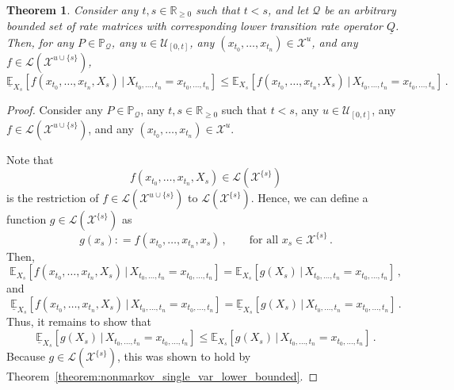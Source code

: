 \documentclass[10pt]{paper}
\newtheorem{theorem}{Theorem}
\newcommand{\reals}{\mathbb{R}}
\newcommand{\realsnonneg}{\reals_{\geq 0}}
\newcommand{\states}{\mathcal{X}}
\newcommand{\processes}{\mathbb{P}}
\newcommand{\gambles}{\mathcal{L}}
\newcommand{\rateset}{\mathcal{Q}}
\newcommand{\lrate}{\underline{Q}}
\newcommand{\coloneqq}{:\!=}
\begin{document}
\begin{theorem}
Consider any $t,s\in\realsnonneg$ such that $t<s$, and let $\rateset$ be an arbitrary bounded set of rate matrices with corresponding lower transition rate operator $\lrate$. Then, for any $P\in\processes_\rateset$, any $u\in\mathcal{U}_{[0,t]}$, any $(x_{t_0},\ldots,x_{t_n})\in\states^u$, and any $f\in\gambles(\states^{u\cup\{s\}})$,
\begin{equation*}
\underline{\mathbb{E}}_{X_s}[f(x_{t_0},\ldots,x_{t_n},X_s)\,\vert\,X_{t_0,\ldots,t_n}=x_{t_0,\ldots,t_n}] \leq \mathbb{E}_{X_s}[f(x_{t_0},\ldots,x_{t_n},X_s)\,\vert\,X_{t_0,\ldots,t_n}=x_{t_0,\ldots,t_n}]\,.
\end{equation*}
\end{theorem}
\begin{proof}
Consider any $P\in\processes_\rateset$, any $t,s\in\realsnonneg$ such that $t<s$, any $u\in\mathcal{U}_{[0,t]}$, any $f\in\gambles(\states^{u\cup\{s\}})$, and any $(x_{t_0},\ldots,x_{t_n})\in\states^u$.

Note that
\begin{equation*}
f(x_{t_0},\ldots,x_{t_n},X_s)\in\gambles(\states^{\{s\}})
\end{equation*}
is the restriction of $f\in\gambles(\states^{u\cup\{s\}})$ to $\gambles(\states^{\{s\}})$. Hence, we can define a function $g\in\gambles(\states^{\{s\}})$ as
\begin{equation*}
g(x_s) \coloneqq f(x_{t_0},\ldots,x_{t_n},x_s)\,,\quad\quad\text{for all $x_s\in\states^{\{s\}}$}\,.
\end{equation*}
Then,
\begin{equation*}
\mathbb{E}_{X_s}[f(x_{t_0},\ldots,x_{t_n},X_s)\,\vert\,X_{t_0,\ldots,t_n}=x_{t_0,\ldots,t_n}] = \mathbb{E}_{X_s}[g(X_s)\,\vert\,X_{t_0,\ldots,t_n}=x_{t_0,\ldots,t_n}]\,,
\end{equation*}
and
\begin{equation*}
\underline{\mathbb{E}}_{X_s}[f(x_{t_0},\ldots,x_{t_n},X_s)\,\vert\,X_{t_0,\ldots,t_n}=x_{t_0,\ldots,t_n}] = \underline{\mathbb{E}}_{X_s}[g(X_s)\,\vert\,X_{t_0,\ldots,t_n}=x_{t_0,\ldots,t_n}]\,.
\end{equation*}
Thus, it remains to show that
\begin{equation*}
\underline{\mathbb{E}}_{X_s}[g(X_s)\,\vert\,X_{t_0,\ldots,t_n}=x_{t_0,\ldots,t_n}] \leq \mathbb{E}_{X_s}[g(X_s)\,\vert\,X_{t_0,\ldots,t_n}=x_{t_0,\ldots,t_n}]\,.
\end{equation*}
Because $g\in\gambles(\states^{\{s\}})$, this was shown to hold by Theorem~\ref{theorem:nonmarkov_single_var_lower_bounded}.
\end{proof}
\end{document}
